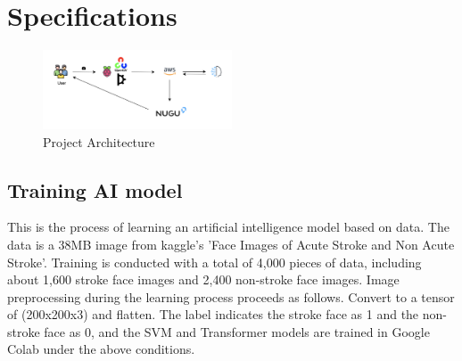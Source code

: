 \section{\textbf{Specifications}}
\begin{figure}[h!]
  \caption{Project Architecture}
  \centering
  \includegraphics[width=0.5\textwidth]{images/SE-architecture.png}
\end{figure}
\subsection{\textbf{Training AI model}}
This is the process of learning an artificial intelligence model based on data. The data is a 38MB image from kaggle's 'Face Images of Acute Stroke and Non Acute Stroke'. Training is conducted with a total of 4,000 pieces of data, including about 1,600 stroke face images and 2,400 non-stroke face images. Image preprocessing during the learning process proceeds as follows. Convert to a tensor of (200x200x3) and flatten. The label indicates the stroke face as 1 and the non-stroke face as 0, and the SVM and Transformer models are trained in Google Colab under the above conditions.\\

